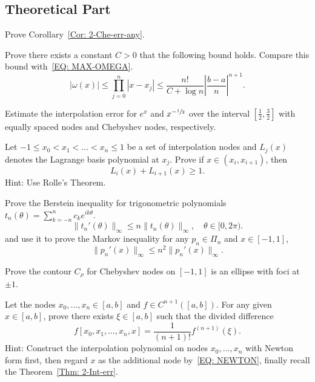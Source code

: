 \subsection{Theoretical Part}
\begin{problem}
    Prove Corollary~\ref{Cor: 2-Che-err-any}.
\end{problem}
\begin{problem}
    Prove there exists a constant $C > 0$ that the following bound holds. Compare this bound with~\eqref{EQ: MAX-OMEGA}.
    \begin{equation}
        |\omega(x)|\le \prod_{j=0}^n |x - x_j| \le \frac{n!}{C + \log n} \left|\frac{b-a}{n}\right|^{n+1}.
    \end{equation}
\end{problem}
\begin{problem}
\label{Prb: 2-Theo-2}
    Estimate the interpolation error for $e^x$ and $x^{-\sfrac{1}{2}}$ over the interval $[\frac{1}{2}, \frac{3}{2}]$ with equally spaced nodes and Chebyshev nodes, respectively.
\end{problem}
\begin{problem}
    Let $-1\le x_0 < x_1 <\dots < x_n \le 1$ be a set of interpolation nodes and $L_j(x)$ denotes the Lagrange basis polynomial at $x_j$. Prove if $x\in (x_i, x_{i+1})$, then 
    $$L_{i}(x) + L_{i+1}(x) \ge 1.$$
    Hint: Use Rolle's Theorem.
\end{problem}
\begin{problem}
    Prove the Berstein inequality  for trigonometric polynomials $t_n(\theta) = \sum_{k=-n}^n c_k e^{ik\theta}$.
    \begin{equation}\nonumber
        \|t_n'(\theta)\|_{\infty} \le n \|t_n(\theta)\|_{\infty},\quad \theta\in [0, 2\pi).
    \end{equation}
    and use it to prove the Markov inequality for any $p_n\in\Pi_n$ and $x\in [-1,1]$, 
    \begin{equation*}
        \|p_n'(x)\|_{\infty}\le n^2 \|p_n'(x)\|_{\infty}.
    \end{equation*}
\end{problem}
\begin{problem}
    Prove the contour $C_{\rho}$ for Chebyshev nodes on $[-1, 1]$ is an ellipse with foci at $\pm 1$. 
\end{problem}
\begin{problem}
\label{Prb: 2-Theo-4}
    Let the nodes $x_0, \dots, x_n\in[a,b]$ and $f\in C^{n+1}([a, b])$. For any given $x\in[a, b]$, prove there exists $\xi\in [a, b]$ such that the divided difference $$f[x_0, x_1, \dots, x_n, x] = \frac{1}{(n+1)!}f^{(n+1)}(\xi).$$
    Hint: {Construct the interpolation polynomial on nodes $x_0, \dots, x_n$ with Newton form first, then regard $x$ as the additional node by~\eqref{EQ: NEWTON}, finally recall the Theorem~\ref{Thm: 2-Int-err}.}
\end{problem}
